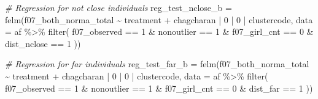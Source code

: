 \documentclass[
]{article}
\newenvironment{Shaded}{\begin{snugshade}}{\end{snugshade}}
\newcommand{\AttributeTok}[1]{\textcolor[rgb]{0.77,0.63,0.00}{#1}}
\newcommand{\CommentTok}[1]{\textcolor[rgb]{0.56,0.35,0.01}{\textit{#1}}}
\newcommand{\DecValTok}[1]{\textcolor[rgb]{0.00,0.00,0.81}{#1}}
\newcommand{\FunctionTok}[1]{\textcolor[rgb]{0.00,0.00,0.00}{#1}}
\newcommand{\NormalTok}[1]{#1}
\newcommand{\OtherTok}[1]{\textcolor[rgb]{0.56,0.35,0.01}{#1}}
\newcommand{\SpecialCharTok}[1]{\textcolor[rgb]{0.00,0.00,0.00}{#1}}
\begin{document}
\begin{Shaded}
\begin{Highlighting}[]
\CommentTok{\# Regression for not close individuals}
\NormalTok{reg\_test\_nclose\_b }\OtherTok{=} \FunctionTok{felm}\NormalTok{(f07\_both\_norma\_total }\SpecialCharTok{\textasciitilde{}}\NormalTok{ treatment }\SpecialCharTok{+} 
\NormalTok{                   chagcharan }\SpecialCharTok{|} \DecValTok{0} \SpecialCharTok{|} \DecValTok{0} \SpecialCharTok{|}\NormalTok{ clustercode,}
         \AttributeTok{data =}\NormalTok{ af }\SpecialCharTok{\%\textgreater{}\%} \FunctionTok{filter}\NormalTok{( }
\NormalTok{                              f07\_observed }\SpecialCharTok{==} \DecValTok{1} \SpecialCharTok{\&}
\NormalTok{                              nonoutlier }\SpecialCharTok{==} \DecValTok{1} \SpecialCharTok{\&}
\NormalTok{                              f07\_girl\_cnt }\SpecialCharTok{==} \DecValTok{0} \SpecialCharTok{\&}
\NormalTok{                              dist\_nclose }\SpecialCharTok{==} \DecValTok{1}
\NormalTok{                              ))}

\CommentTok{\# Regression for far individuals}
\NormalTok{reg\_test\_far\_b }\OtherTok{=} \FunctionTok{felm}\NormalTok{(f07\_both\_norma\_total }\SpecialCharTok{\textasciitilde{}}\NormalTok{ treatment }\SpecialCharTok{+} 
\NormalTok{                   chagcharan }\SpecialCharTok{|} \DecValTok{0} \SpecialCharTok{|} \DecValTok{0} \SpecialCharTok{|}\NormalTok{ clustercode,}
         \AttributeTok{data =}\NormalTok{ af }\SpecialCharTok{\%\textgreater{}\%} \FunctionTok{filter}\NormalTok{( }
\NormalTok{                              f07\_observed }\SpecialCharTok{==} \DecValTok{1} \SpecialCharTok{\&}
\NormalTok{                              nonoutlier }\SpecialCharTok{==} \DecValTok{1} \SpecialCharTok{\&}
\NormalTok{                              f07\_girl\_cnt }\SpecialCharTok{==} \DecValTok{0} \SpecialCharTok{\&}
\NormalTok{                              dist\_far }\SpecialCharTok{==} \DecValTok{1}
\NormalTok{                              ))}
\end{Highlighting}
\end{Shaded}
\end{document}
